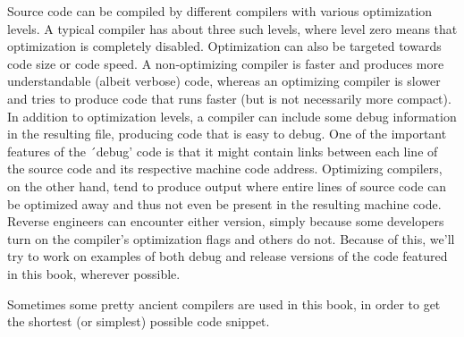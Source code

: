 Source code can be compiled by different compilers with various optimization levels.
A typical compiler has about three such levels, where level zero means that optimization is completely disabled.
Optimization can also be targeted towards code size or code speed.
A non-optimizing compiler is faster and produces more understandable (albeit verbose) code,
whereas an optimizing compiler is slower and tries to produce code that runs faster (but is not necessarily more compact).
In addition to optimization levels, a compiler can include some debug information in the resulting file,
producing code that is easy to debug.
One of the important features of the ´debug' code is that it might contain links
between each line of the source code and its respective machine code address.
Optimizing compilers, on the other hand, tend to produce output where entire lines of source code
can be optimized away and thus not even be present in the resulting machine code.
Reverse engineers can encounter either version, simply because some developers turn on the compiler's optimization flags and others do not.
Because of this, we'll try to work on examples of both debug and release versions of the code featured in this book, wherever possible.

Sometimes some pretty ancient compilers are used in this book, in order to get the shortest (or simplest) possible code snippet.
